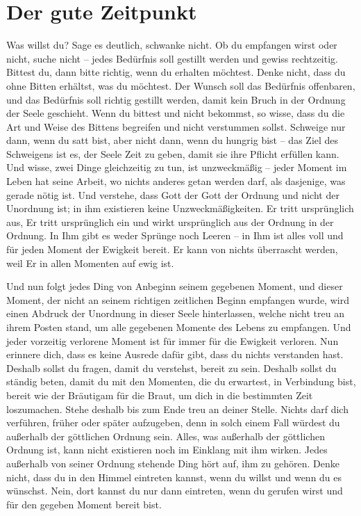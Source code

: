 \chapter{Der gute Zeitpunkt}

Was willst du? Sage es deutlich, schwanke nicht. Ob du empfangen wirst oder nicht, suche nicht -- jedes Bedürfnis soll gestillt werden und gewiss rechtzeitig. Bittest du, dann bitte richtig, wenn du erhalten möchtest. Denke nicht, dass du ohne Bitten erhältst, was du möchtest. Der Wunsch soll das Bedürfnis offenbaren, und das Bedürfnis soll richtig gestillt werden, damit kein Bruch in der Ordnung der Seele geschieht. Wenn du bittest und nicht bekommst, so wisse, dass du die Art und Weise des Bittens begreifen und nicht verstummen sollst. Schweige nur dann, wenn du satt bist, aber nicht dann, wenn du hungrig bist -- das Ziel des Schweigens ist es, der Seele Zeit zu geben, damit sie ihre Pflicht erfüllen kann. Und wisse, zwei Dinge gleichzeitig zu tun, ist unzweckmäßig -- jeder Moment im Leben hat seine Arbeit, wo nichts anderes getan werden darf, als dasjenige, was gerade nötig ist. Und verstehe, dass Gott der Gott der Ordnung und nicht der Unordnung ist; in ihm existieren keine Unzweckmäßigkeiten. Er tritt ursprünglich aus, Er tritt ursprünglich ein und wirkt ursprünglich aus der Ordnung in der Ordnung. In Ihm gibt es weder Sprünge noch Leeren -- in Ihm ist alles voll und für jeden Moment der Ewigkeit bereit. Er kann von nichts überrascht werden, weil Er in allen Momenten auf ewig ist.

Und nun folgt jedes Ding von Anbeginn seinem gegebenen Moment, und dieser Moment, der nicht an seinem richtigen zeitlichen Beginn empfangen wurde, wird einen Abdruck der Unordnung in dieser Seele hinterlassen, welche nicht treu an ihrem Posten stand, um alle gegebenen Momente des Lebens zu empfangen. Und jeder vorzeitig verlorene Moment ist für immer für die Ewigkeit verloren. Nun erinnere dich, dass es keine Ausrede dafür gibt, dass du nichts verstanden hast. Deshalb sollst du fragen, damit du verstehst, bereit zu sein. Deshalb sollst du ständig beten, damit du mit den Momenten, die du erwartest, in Verbindung bist, bereit wie der Bräutigam für die Braut, um dich in die bestimmten Zeit loszumachen. Stehe deshalb bis zum Ende treu an deiner Stelle. Nichts darf dich verführen, früher oder später aufzugeben, denn in solch einem Fall würdest du außerhalb der göttlichen Ordnung sein. Alles, was außerhalb der göttlichen Ordnung ist, kann nicht existieren noch im Einklang mit ihm wirken. Jedes außerhalb von seiner Ordnung stehende Ding hört auf, ihm zu gehören. Denke nicht, dass du in den Himmel eintreten kannst, wenn du willst und wenn du es wünschst. Nein, dort kannst du nur dann eintreten, wenn du gerufen wirst und für den gegeben Moment bereit bist. 

